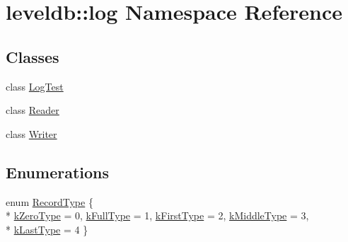 \hypertarget{namespaceleveldb_1_1log}{}\section{leveldb\+:\+:log Namespace Reference}
\label{namespaceleveldb_1_1log}
\subsection*{Classes}
\begin{DoxyCompactItemize}
\item 
class \hyperlink{classleveldb_1_1log_1_1_log_test}{Log\+Test}
\item 
class \hyperlink{classleveldb_1_1log_1_1_reader}{Reader}
\item 
class \hyperlink{classleveldb_1_1log_1_1_writer}{Writer}
\end{DoxyCompactItemize}
\subsection*{Enumerations}
\begin{DoxyCompactItemize}
\item 
enum \hyperlink{namespaceleveldb_1_1log_a01bdc1b51beb634f14f8fbb70fbd8d2a}{Record\+Type} \{ \\*
\hyperlink{namespaceleveldb_1_1log_a01bdc1b51beb634f14f8fbb70fbd8d2aa5a96fbcdf2a8be4834c61233ec2cea2e}{k\+Zero\+Type} = 0, 
\hyperlink{namespaceleveldb_1_1log_a01bdc1b51beb634f14f8fbb70fbd8d2aa2c77e6c3871e8ec5506f9f9c2e7dfb13}{k\+Full\+Type} = 1, 
\hyperlink{namespaceleveldb_1_1log_a01bdc1b51beb634f14f8fbb70fbd8d2aa46ff8d418146ec7ce6c3a883e89b48da}{k\+First\+Type} = 2, 
\hyperlink{namespaceleveldb_1_1log_a01bdc1b51beb634f14f8fbb70fbd8d2aa50ec9d5a2236253d02c0abd55d178e08}{k\+Middle\+Type} = 3, 
\\*
\hyperlink{namespaceleveldb_1_1log_a01bdc1b51beb634f14f8fbb70fbd8d2aa29f913fb4d719f97a9618bca93775dfc}{k\+Last\+Type} = 4
 \}
\end{DoxyCompactItemize}
